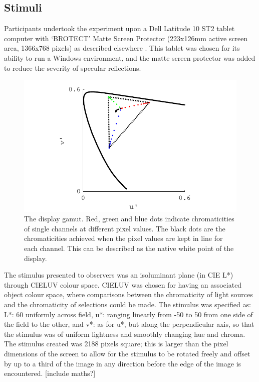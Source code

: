 \subsection{Stimuli}

Participants undertook the experiment upon a Dell Latitude 10 ST2 tablet computer with ‘BROTECT’ Matte Screen Protector (223x126mm active screen area, 1366x768 pixels) as described elsewhere \citep{garside_estimating_2016}. This tablet was chosen for its ability to run a Windows environment, and the matte screen protector was added to reduce the severity of specular reflections. 

\begin{figure}[hbp]
\includegraphics[width=\textwidth]{figs/tablet/gamut.pdf}
\caption{The display gamut. Red, green and blue dots indicate chromaticities of single channels at different pixel values. The black dots are the chromaticities achieved when the pixel values are kept in line for each channel. This can be described as the native white point of the display.}
\label{fig:gamut}
\end{figure}

The stimulus presented to observers was an isoluminant plane (in CIE L*) through CIELUV colour space. CIELUV was chosen for having an associated object colour space, where comparisons between the chromaticity of light sources and the chromaticity of selections could be made. The stimulus was specified as: L*: 60 uniformly across field, u*: ranging linearly from -50 to 50 from one side of the field to the other, and v*: as for u*, but along the perpendicular axis, so that the stimulus was of uniform lightness and smoothly changing hue and chroma. The stimulus created was 2188 pixels square; this is larger than the pixel dimensions of the screen to allow for the stimulus to be rotated freely and offset by up to a third of the image in any direction before the edge of the image is encountered. [include maths?]

